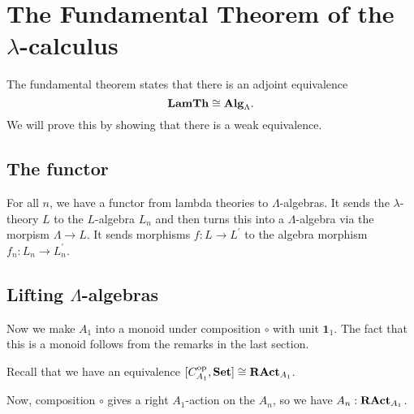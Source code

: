 \section{The Fundamental Theorem of the \texorpdfstring{$ \lambda $-}{lambda }calculus}

The fundamental theorem states that there is an adjoint equivalence
\[ \mathbf{LamTh} \cong \mathbf{Alg}_{\Lambda}. \]
We will prove this by showing that there is a weak equivalence.


\subsection{The functor}

\begin{definition}
  For all $ n $, we have a functor from lambda theories to $ \Lambda $-algebras. It sends the $ \lambda $-theory $ L $ to the $ L $-algebra $ L_n $ and then turns this into a $ \Lambda $-algebra via the morpism $ \Lambda \to L $. It sends morphisms $ f: L \to L^\prime $ to the algebra morphism $ f_n : L_n \to L^\prime_n $.
\end{definition}


\subsection{Lifting \texorpdfstring{$ \Lambda $}{Lambda}-algebras}

\begin{definition}
  Now we make $ A_1 $ into a monoid under composition $ \circ $ with unit $ \mathbf 1_1 $. The fact that this is a monoid follows from the remarks in the last section.
\end{definition}

Recall that we have an equivalence $ [C_{A_1}^{\text{op}}, \mathbf{Set}] \cong \mathbf{RAct}_{A_1} $.

\begin{definition}
  Now, composition $ \circ $ gives a right $ A_1 $-action on the $ A_n $, so we have $ A_n : \mathbf{RAct}_{A_1} $.
\end{definition}

